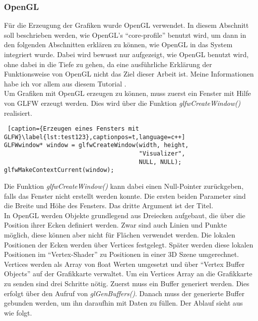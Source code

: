 \documentclass[11pt,a4paper]{article}
\begin{document}
\subsubsection*{OpenGL}
Für die Erzeugung der Grafiken wurde OpenGL verwendet. In diesem Abschnitt soll beschrieben werden, wie OpenGL's ``core-profile'' benutzt wird, um dann in den folgenden Abschnitten erklären zu können, wie OpenGL in das System integriert wurde. Dabei wird bewusst nur aufgezeigt, wie OpenGL benutzt wird, ohne dabei in die Tiefe zu gehen, da eine ausführliche Erklärung der Funktionsweise von OpenGL nicht das Ziel dieser Arbeit ist. Meine Informationen habe ich vor allem aus diesem Tutorial \cite{LearnOpenGL}.\\
Um Grafiken mit OpenGL erzeugen zu können, muss zuerst ein Fenster mit Hilfe von GLFW erzeugt werden. Dies wird über die Funktion \mbox{\textit{glfwCreateWindow()}} realisiert.

\begin{lstlisting} [caption={Erzeugen eines Fensters mit GLFW}\label{lst:test123},captionpos=t,language=c++]
GLFWwindow* window = glfwCreateWindow(width, height,
                                      "Visualizer",
                                      NULL, NULL);
glfwMakeContextCurrent(window);
\end{lstlisting}
\noindent
Die Funktion \mbox{\textit{glfwCreateWindow()}} kann dabei einen Null-Pointer zurückgeben, falls das Fenster nicht erstellt werden konnte. Die ersten beiden Parameter sind die Breite und Höhe des Fensters. Das dritte Argument ist der Titel.\\
In OpenGL werden Objekte grundlegend aus Dreiecken aufgebaut, die über die Position ihrer Ecken definiert werden. Zwar sind auch Linien  und Punkte möglich, diese können aber nicht für Flächen verwendet werden. Die lokalen Positionen der Ecken werden über Vertices festgelegt. Später werden diese lokalen Positionen im ``Vertex-Shader'' zu Positionen in einer 3D Szene umgerechnet.\\
Vertices werden als Array von float Werten umgesetzt und über ``Vertex Buffer Objects'' auf der Grafikkarte verwaltet. Um ein Vertices Array an die Grafikkarte zu senden sind drei Schritte nötig. Zuerst muss ein Buffer generiert werden. Dies erfolgt über den Aufruf von \mbox{\textit{glGenBuffers()}}. Danach muss der generierte Buffer gebunden werden, um ihn daraufhin mit Daten zu füllen. Der Ablauf sieht aus wie folgt.
\end{document}
